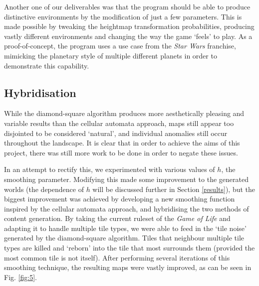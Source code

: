 \documentclass[12pt,a4paper]{article}
\begin{document}



Another one of our deliverables was that the program should be able to produce distinctive environments by the modification of just a few parameters. This is made possible by tweaking the heightmap transformation probabilities, producing vastly different environments and changing the way the game `feels' to play. As a proof-of-concept, the program uses a use case from the \emph{Star Wars} franchise, mimicking the planetary style of multiple different planets in order to demonstrate this capability. 


\subsection{Hybridisation}

While the diamond-square algorithm produces more aesthetically pleasing and variable results than the cellular automata approach, maps still appear too disjointed to be considered `natural', and individual anomalies still occur throughout the landscape. It is clear that in order to achieve the aims of this project, there was still more work to be done in order to negate these issues. 

In an attempt to rectify this, we experimented with various values of $h$, the smoothing parameter. Modifying this made some improvement to the generated worlds (the dependence of $h$ will be discussed further in Section \ref{results}), but the biggest improvement was achieved by developing a new smoothing function inspired by the cellular automata approach, and hybridising the two methods of content generation. By taking the current ruleset of the \emph{Game of Life} and adapting it to handle multiple tile types, we were able to feed in the `tile noise' generated by the diamond-square algorithm. Tiles that neighbour multiple tile types are killed and `reborn' into the tile that most surrounds them (provided the most common tile is not itself). After performing several iterations of this smoothing technique, the resulting maps were vastly improved, as can be seen in Fig. \ref{fig:5}.
\end{document}
